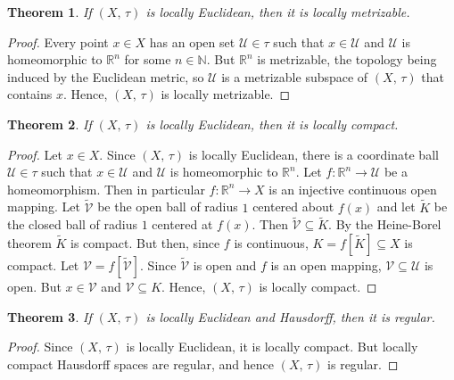 \documentclass{article}
\theoremstyle{plain}
\newtheorem{theorem}{Theorem}[section]
\theoremstyle{normal}
\begin{document}
        \begin{theorem}
            If $(X,\,\tau)$ is locally Euclidean, then it is locally metrizable.
        \end{theorem}
        \begin{proof}
            Every point $x\in{X}$ has an open set $\mathcal{U}\in\tau$ such
            that $x\in\mathcal{U}$ and $\mathcal{U}$ is homeomorphic to
            $\mathbb{R}^{n}$ for some $n\in\mathbb{N}$. But $\mathbb{R}^{n}$
            is metrizable, the topology being induced by the Euclidean metric,
            so $\mathcal{U}$ is a metrizable subspace of $(X,\,\tau)$ that
            contains $x$. Hence, $(X,\,\tau)$ is locally metrizable.
        \end{proof}
        \begin{theorem}
            If $(X,\,\tau)$ is locally Euclidean, then it is locally compact.
        \end{theorem}
        \begin{proof}
            Let $x\in{X}$. Since $(X,\,\tau)$ is locally Euclidean, there is
            a coordinate ball $\mathcal{U}\in\tau$ such that $x\in\mathcal{U}$
            and $\mathcal{U}$ is homeomorphic to $\mathbb{R}^{n}$. Let
            $f:\mathbb{R}^{n}\rightarrow\mathcal{U}$ be a homeomorphism. Then
            in particular $f:\mathbb{R}^{n}\rightarrow{X}$ is an injective
            continuous open mapping. Let $\tilde{\mathcal{V}}$ be the open
            ball of radius $1$ centered about $f(x)$ and let $\tilde{K}$ be the
            closed ball of radius $1$ centered at $f(x)$. Then
            $\tilde{\mathcal{V}}\subseteq\tilde{K}$. By the Heine-Borel theorem
            $\tilde{K}$ is compact. But then, since $f$ is continuous,
            $K=f[\tilde{K}]\subseteq{X}$ is compact. Let
            $\mathcal{V}=f[\tilde{\mathcal{V}}]$. Since $\tilde{\mathcal{V}}$ is
            open and $f$ is an open mapping, $\mathcal{V}\subseteq\mathcal{U}$
            is open. But $x\in\mathcal{V}$ and $\mathcal{V}\subseteq{K}$.
            Hence, $(X,\,\tau)$ is locally compact.
        \end{proof}
        \begin{theorem}
            If $(X,\,\tau)$ is locally Euclidean and Hausdorff, then it is
            regular.
        \end{theorem}
        \begin{proof}
            Since $(X,\,\tau)$ is locally Euclidean, it is locally compact.
            But locally compact Hausdorff spaces are regular, and hence
            $(X,\,\tau)$ is regular.
        \end{proof}
\end{document}
